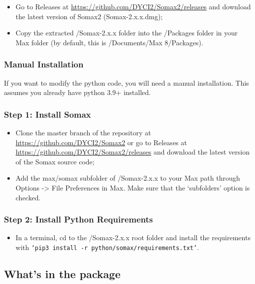 \begin{itemize}
    \item Go to Releases at \url{https://github.com/DYCI2/Somax2/releases} and download the latest version of Somax2 (Somax-2.x.x.dmg);
    \item Copy the extracted /Somax-2.x.x folder  into the /Packages folder in your Max folder (by default, this is /Documents/Max 8/Packages).
\end{itemize}

\subsubsection{Manual Installation}

If you want to modify the python code, you will need a manual installation. This assumes you already have python 3.9+ installed.

\subsubsection{Step 1: Install Somax}

\begin{itemize}
    \item Clone the master branch of the repository at \url{https://github.com/DYCI2/Somax2} or go to Releases at \url{https://github.com/DYCI2/Somax2/releases} and download the latest version of the Somax source code;
    \item Add the max/somax subfolder of /Somax-2.x.x to your Max path through Options -> File Preferences in Max. Make sure that the `subfolders' option is checked.
\end{itemize}

\subsubsection{Step 2: Install Python Requirements}

\begin{itemize}
    \item In a terminal, cd to the /Somax-2.x.x root folder and install the requirements with \texttt{`pip3 install -r python/somax/requirements.txt'}.
\end{itemize}



\subsection{What's in the package}

